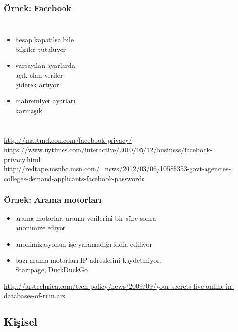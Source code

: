 \documentclass[dvipsnames]{beamer}
\theoremstyle{plain}
\begin{document}
\begin{frame}
  \frametitle{Örnek: Facebook}

  \begin{columns}

    \begin{itemize}
      \item hesap kapatılsa bile\\
        bilgiler tutuluyor
      \item varsayılan ayarlarda\\
        açık olan veriler\\
        giderek artıyor
      \item mahremiyet ayarları\\
        karmaşık
    \end{itemize}
  \end{columns}

  \medskip
  \tiny{\url{http://mattmckeon.com/facebook-privacy/}}\\
  \tiny{\url{https://www.nytimes.com/interactive/2010/05/12/business/facebook-privacy.html}}\\
  \tiny{\url{http://redtape.msnbc.msn.com/_news/2012/03/06/10585353-govt-agencies-colleges-demand-applicants-facebook-passwords}}\\
\end{frame}

\begin{frame}
  \frametitle{Örnek: Arama motorları}

  \begin{itemize}
    \item arama motorları arama verilerini bir süre sonra\\
      anonimize ediyor
    \item anonimizasyonun işe yaramadığı iddia ediliyor

    \medskip
    \item bazı arama motorları IP adreslerini kaydetmiyor:\\
      Startpage, DuckDuckGo
  \end{itemize}

  \medskip
  \tiny{\url{http://arstechnica.com/tech-policy/news/2009/09/your-secrets-live-online-in-databases-of-ruin.ars}}\\
\end{frame}

\subsection{Kişisel}
\end{document}
